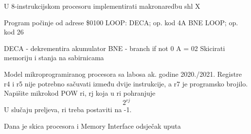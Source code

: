\documentclass{studosi-workbook}
\begin{document}
	
	\begin{zadatak} [MI-2020]
		U 8-instrukcijskom procesoru implementirati makronaredbu shl X
	\end{zadatak}	
	
	
	\begin{zadatak} [MI-2020]
		Program počinje od adrese \$0100
		\newline
		LOOP:  \char0009    DECA; op. kod 4A
		\newline
	         
	         BNE LOOP; op. kod 26
	    \newline
	    
	    DECA - dekrementira akumulator
	    \newline
	    BNE  - branch if not 0
	    \newline
	    A = 02
	    \newline
	    Skicirati memoriju i stanja na sabirnicama
	    \newline	
	\end{zadatak}
	
	
	\begin{zadatak} [MI-2020]
		Model mikroprogramiranog procesora sa labosa ak. godine 2020./2021.\newline
		Registre r4 i r5 nije potrebno sačuvati između dvije instrukcije, a r7 je programsko brojilo.\newline
		Napišite mikrokod POW ri, rj koja u ri pohranjuje \[2^{rj}\]
		U slučaju preljeva, ri treba postaviti na -1.\newline
		
		Dana je skica procesora i Memory Interface odsječak uputa
	\end{zadatak}
	
\end{document}
